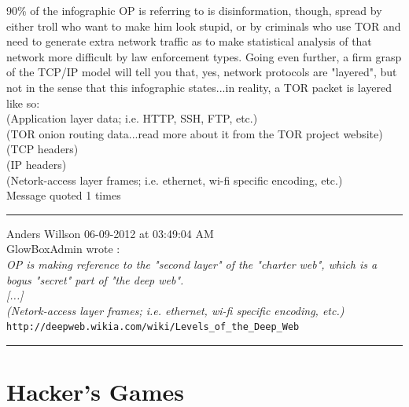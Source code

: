\documentclass[11pt,twoside,a4paper]{book}
\begin{document}
\begin{multicols*}{2}
90\% of the infographic OP is referring to is disinformation, though, spread by either troll who want to make him look stupid, or by criminals who use TOR and need to generate extra network traffic as to make statistical analysis of that network more difficult by law enforcement types. Going even further, a firm grasp of the TCP/IP model will tell you that, yes, network protocols are "layered", but not in the sense that this infographic states...in reality, a TOR packet is layered like so:~\\
(Application layer data; i.e. HTTP, SSH, FTP, etc.)~\\
(TOR onion routing data...read more about it from the TOR project website)~\\
(TCP headers)~\\
(IP headers)~\\
(Netork-access layer frames; i.e. ethernet, wi-fi specific encoding, etc.)~\\
Message quoted 1 times

\begin{center} \rule{0.45\textwidth}{0.01cm} \end{center}

Anders Willson 06-09-2012 at 03:49:04 AM~\\

GlowBoxAdmin wrote :~\\

\emph{OP is making reference to the "second layer" of the "charter web", which is a bogus "secret" part of "the deep web".}~\\
\emph{[...]}~\\
\emph{(Netork-access layer frames; i.e. ethernet, wi-fi specific encoding, etc.)}~\\

\texttt{http://deepweb.wikia.com/wiki/Levels\_of\_the\_Deep\_Web}~\\

\begin{center} \rule{0.45\textwidth}{0.01cm} \end{center}

\end{multicols*}

\clearpage

\chapter{Hacker's Games} %
\end{document}
